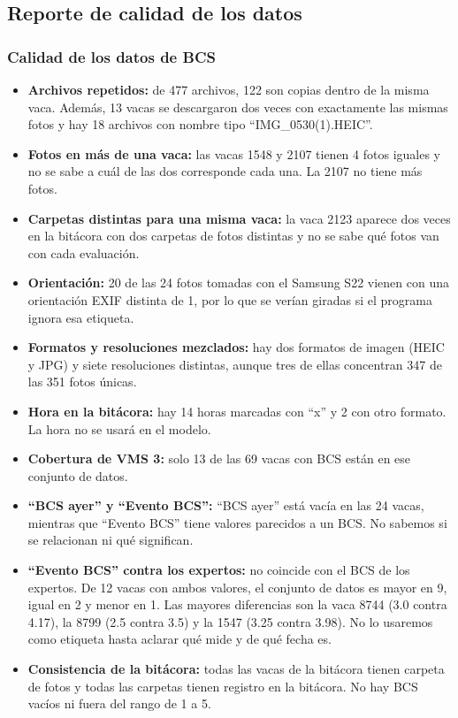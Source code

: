 \subsection{Reporte de calidad de los datos}

\subsubsection*{Calidad de los datos de BCS}

\begin{itemize}
  \item \textbf{Archivos repetidos:} de 477 archivos, 122 son copias dentro de la misma vaca. Además, 13 vacas se descargaron dos veces con exactamente las mismas fotos y hay 18 archivos con nombre tipo ``IMG\_0530(1).HEIC''.
  \item \textbf{Fotos en más de una vaca:} las vacas 1548 y 2107 tienen 4 fotos iguales y no se sabe a cuál de las dos corresponde cada una. La 2107 no tiene más fotos.
  \item \textbf{Carpetas distintas para una misma vaca:} la vaca 2123 aparece dos veces en la bitácora con dos carpetas de fotos distintas y no se sabe qué fotos van con cada evaluación.
  \item \textbf{Orientación:} 20 de las 24 fotos tomadas con el Samsung S22 vienen con una orientación EXIF distinta de 1, por lo que se verían giradas si el programa ignora esa etiqueta.
  \item \textbf{Formatos y resoluciones mezclados:} hay dos formatos de imagen (HEIC y JPG) y siete resoluciones distintas, aunque tres de ellas concentran 347 de las 351 fotos únicas.
  \item \textbf{Hora en la bitácora:} hay 14 horas marcadas con ``x'' y 2 con otro formato. La hora no se usará en el modelo.
  \item \textbf{Cobertura de VMS 3:} solo 13 de las 69 vacas con BCS están en ese conjunto de datos.
  \item \textbf{``BCS ayer'' y ``Evento BCS'':} ``BCS ayer'' está vacía en las 24 vacas, mientras que ``Evento BCS'' tiene valores parecidos a un BCS. No sabemos si se relacionan ni qué significan.
  \item \textbf{``Evento BCS'' contra los expertos:} no coincide con el BCS de los expertos. De 12 vacas con ambos valores, el conjunto de datos es mayor en 9, igual en 2 y menor en 1. Las mayores diferencias son la vaca 8744 (3.0 contra 4.17), la 8799 (2.5 contra 3.5) y la 1547 (3.25 contra 3.98). No lo usaremos como etiqueta hasta aclarar qué mide y de qué fecha es.
  \item \textbf{Consistencia de la bitácora:} todas las vacas de la bitácora tienen carpeta de fotos y todas las carpetas tienen registro en la bitácora. No hay BCS vacíos ni fuera del rango de 1 a 5.
\end{itemize}

